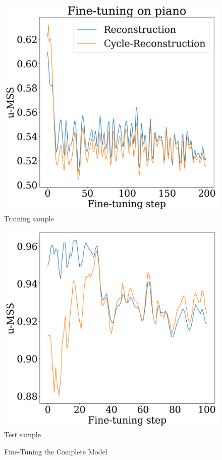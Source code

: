 \begin{figure}
    \begin{minipage}[b]{0.45\textwidth}
        \centering
        \includegraphics[width=\textwidth]{figures/fine-tuning/exp1/metrics_over_step_train.png}
        \small{\newline Training sample}
    \end{minipage}
    \hfill
    \begin{minipage}[b]{0.45\textwidth}
        \includegraphics[width=\textwidth]{figures/fine-tuning/exp1/metrics_over_step_twinkle.png}
        \small{\newline Test sample}
        \centering
    \end{minipage}
    \caption{Fine-Tuning the Complete Model}
    \label{fig:fine-tune-complete}
    
\end{figure}

